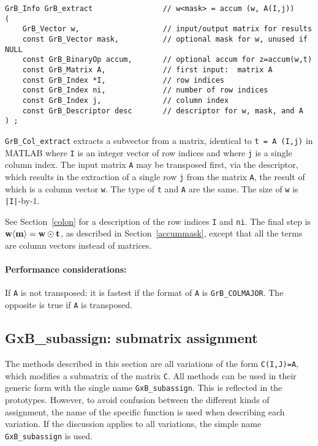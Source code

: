 \documentclass[12pt]{article}
\begin{document}
\begin{mdframed}[userdefinedwidth=6in]
{\footnotesize
\begin{verbatim}
GrB_Info GrB_extract                // w<mask> = accum (w, A(I,j))
(
    GrB_Vector w,                   // input/output matrix for results
    const GrB_Vector mask,          // optional mask for w, unused if NULL
    const GrB_BinaryOp accum,       // optional accum for z=accum(w,t)
    const GrB_Matrix A,             // first input:  matrix A
    const GrB_Index *I,             // row indices
    const GrB_Index ni,             // number of row indices
    const GrB_Index j,              // column index
    const GrB_Descriptor desc       // descriptor for w, mask, and A
) ;
\end{verbatim} } \end{mdframed}

\verb'GrB_Col_extract' extracts a subvector from a matrix, identical to
\verb't = A (I,j)' in MATLAB where \verb'I' is an integer vector of row indices
and where \verb'j' is a single column index.  The input matrix \verb'A' may be
transposed first, via the descriptor, which results in the extraction of a
single row \verb'j' from the matrix \verb'A', the result of which is a column
vector \verb'w'.  The type of \verb't' and \verb'A' are the same.
The size of \verb'w' is \verb'|I|'-by-1.

See Section~\ref{colon} for a description of the row indices
\verb'I' and \verb'ni'.
The final step is ${\bf w \langle m
\rangle  = w \odot t}$, as described in Section~\ref{accummask}, except that
all the terms are column vectors instead of matrices.

\paragraph{\bf Performance considerations:} %
If \verb'A' is not transposed: it is fastest if the format of \verb'A' is
\verb'GrB_COLMAJOR'.  The opposite is true if \verb'A' is transposed.

\newpage
\subsection{{\sf GxB\_subassign:} submatrix assignment} %
\label{subassign}

The methods described in this section are all variations of the form
\verb'C(I,J)=A', which modifies a submatrix of the matrix \verb'C'.  All
methods can be used in their generic form with the single name
\verb'GxB_subassign'.  This is reflected in the prototypes.  However, to avoid
confusion between the different kinds of assignment, the name of the specific
function is used when describing each variation.  If the discussion applies to
all variations, the simple name \verb'GxB_subassign' is used.
\end{document}
